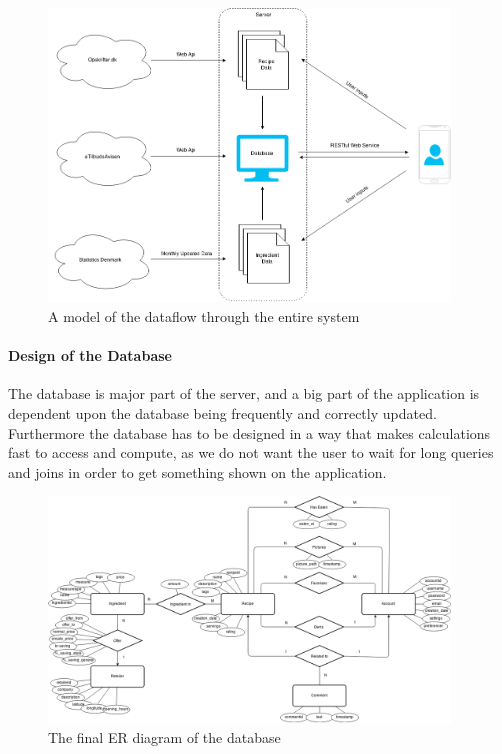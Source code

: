 \begin{figure}
\label{fig:dataflow}
\centering
\includegraphics[width=0.95\textwidth]{Pictures/dataflow}
\caption{A model of the dataflow through the entire system}
\end{figure}

\paragraph{Design of the Database}
\label{para:dbdesign}

The database is major part of the server, and a big part of the application is dependent upon the database being frequently and correctly updated. Furthermore the database has to be designed in a way that makes calculations fast to access and compute, as we do not want the user to wait for long queries and joins in order to get something shown on the application. 

\begin{figure}
\label{fig:ER-diagram}
\centering
\includegraphics[width=0.95\textwidth]{Pictures/ERdiagram}
\caption{The final ER diagram of the database}
\end{figure}

